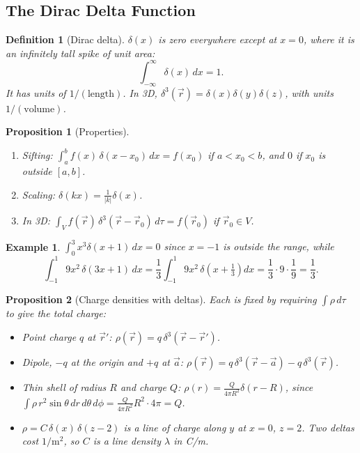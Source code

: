 \documentclass{article}
\newtheorem{definition}{Definition}
\newtheorem*{example}{Example}
\newtheorem{proposition}{Proposition}
\begin{document}
\subsection{The Dirac Delta Function}
\begin{definition}[Dirac delta]
    $\delta(x)$ is zero everywhere except at $x = 0$, where it is an infinitely tall spike of unit area:
    \[\int_{-\infty}^{\infty}\delta(x)\,dx = 1.\]
    It has units of $1/(\text{length})$. In 3D, $\delta^3(\vec{r}) = \delta(x)\delta(y)\delta(z)$, with units $1/(\text{volume})$.
\end{definition}
\begin{proposition}[Properties]
    \begin{enumerate}[label=(\roman*)]
        \item Sifting: $\int_a^b f(x)\,\delta(x - x_0)\,dx = f(x_0)$ if $a < x_0 < b$, and $0$ if $x_0$ is outside $[a,b]$.
        \item Scaling: $\delta(kx) = \frac{1}{|k|}\delta(x)$.
        \item In 3D: $\int_V f(\vec{r})\,\delta^3(\vec{r} - \vec{r}_0)\,d\tau = f(\vec{r}_0)$ if $\vec{r}_0 \in V$.
    \end{enumerate}
\end{proposition}
\begin{example}
    $\int_0^3 x^3\delta(x+1)\,dx = 0$ since $x = -1$ is outside the range, while
    \[\int_{-1}^{1}9x^2\,\delta(3x+1)\,dx = \frac{1}{3}\int_{-1}^{1}9x^2\,\delta\!\left(x+\tfrac{1}{3}\right)dx = \frac{1}{3}\cdot 9\cdot\frac{1}{9} = \frac{1}{3}.\]
\end{example}
\begin{proposition}[Charge densities with deltas]
    Each is fixed by requiring $\int\rho\,d\tau$ to give the total charge:
    \begin{itemize}
        \item Point charge $q$ at $\vec{r}'$: $\rho(\vec{r}) = q\,\delta^3(\vec{r} - \vec{r}')$.
        \item Dipole, $-q$ at the origin and $+q$ at $\vec{a}$: $\rho(\vec{r}) = q\,\delta^3(\vec{r} - \vec{a}) - q\,\delta^3(\vec{r})$.
        \item Thin shell of radius $R$ and charge $Q$: $\rho(r) = \frac{Q}{4\pi R^2}\delta(r - R)$, since $\int\rho\,r^2\sin\theta\,dr\,d\theta\,d\phi = \frac{Q}{4\pi R^2}R^2\cdot 4\pi = Q$.
        \item $\rho = C\,\delta(x)\,\delta(z-2)$ is a line of charge along $y$ at $x = 0$, $z = 2$. Two deltas cost $1/\text{m}^2$, so $C$ is a line density $\lambda$ in C/m.
    \end{itemize}
\end{proposition}
\end{document}
